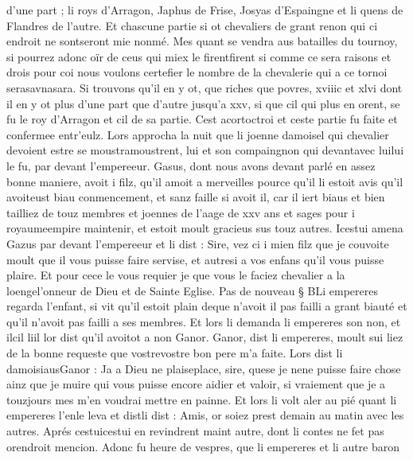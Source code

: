 \documentclass{article}
\begin{document}
\begin{pages}
   d’une part ; li roys d’Arragon,
   Japhus de Frise,
   Josyas d’Espaingne et
   li quens de Flandres de l’autre. Et chascune partie si ot 
   chevaliers de grant renon qui ci endroit ne sontseront mie nonmé.
   Mes quant se vendra aus batailles du tournoy, si pourrez adonc oïr
   de ceus qui miex le firentfirent si comme ce sera raisons et drois 
   pour coi nous voulons certefier le nombre de la chevalerie
   qui a ce tornoi serasavnasara.
   Si trouvons qu’il en y ot, que riches que povres,
   xviiic et xlvi dont il en y ot plus d’une part que d’autre jusqu’a
   xxv, si que cil qui plus en orent, se fu
   le roy d’Arragon et cil de sa partie.
   Cest acortoctroi et ceste partie fu faite et confermee entr’eulz. 
   Lors approcha la nuit que
   li joenne damoisel qui chevalier devoient estre se moustramoustrent, 
   lui et son compaingnon qui devantavec 
      luilui le fu,
   par devant l’empereeur. \pend
\pstart Gasus, 
   dont nous avons devant parlé en assez bonne maniere,
   avoit i filz, qu’il amoit a merveilles pource qu’il li estoit avis qu’il 
   avoiteust biau conmencement,
   et sanz faille si avoit il, car il iert biaus et bien tailliez de touz membres et 
   joennes 
   de l’aage de xxv ans et sages pour i 
   royaumeempire maintenir, et 
   estoit moult gracieus sus touz autres.
   Icestui amena Gazus par devant l’empereeur et li dist :
   Sire, vez ci i mien filz
      que je couvoite moult que il vous puisse faire servise, et autresi a vos enfans qu’il vous puisse plaire.
      Et pour cece le vous requier je que vous le faciez chevalier a 
      la loengel'onneur de Dieu et de Sainte Eglise. \pend
\pstart Pas de nouveau § BLi empereres regarda l’enfant, 
   si vit qu’il estoit plain deque n'avoit il pas failli a 
   grant biauté et qu’il n’avoit pas failli a ses membres. 
   Et lors li demanda li empereres son non, 
   et ilcil liil lor dist 
   qu’il avoitot a non 
      Ganor.
   Ganor, dist li empereres,
      moult sui liez de la bonne requeste que 
      vostrevostre bon pere m’a faite.
   Lors dist li damoisiausGanor :
   Ja a Dieu ne 
      plaiseplace, sire, 
      quese je
      nene puisse faire chose
      ainz que je muire qui vous puisse encore aidier et valoir, 
      si vraiement que je a touzjours mes m’en voudrai mettre en painne.
   Et lors li volt aler au pié quant li empereres 
   l’enle leva et 
   distli dist :
   Amis, or soiez prest demain au matin avec les autres.
   Aprés cestuicestui en revindrent maint autre, 
   dont li contes ne fet pas orendroit mencion. Adonc fu heure de vespres, 
   que li empereres et li autre baron 

\end{pages}
\end{document}

